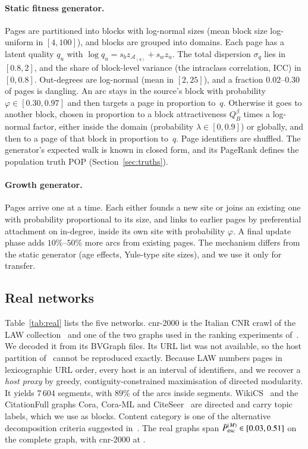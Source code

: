 \documentclass[11pt,a4paper]{article}
\theoremstyle{definition}
\theoremstyle{remark}
\newcommand{\Pbar}{\bar P^{(M)}_{\mathrm{esc}}}
\begin{document}
\paragraph{Static fitness generator.} Pages are partitioned into blocks with log-normal sizes (mean
block size log-uniform in $[4,100]$), and blocks are grouped into domains. Each page has a latent quality
$q_u$ with $\log q_u=s_bz_{\mathcal A_{(u)}}+s_wz_u$. The total dispersion $\sigma_q$ lies in $[0.8,2]$,
and the share of block-level variance (the intraclass correlation, ICC) in $[0,0.8]$. Out-degrees are
log-normal (mean in $[2,25]$), and a fraction $0.02$--$0.30$ of pages is dangling. An arc stays in the
source's block with probability $\varphi\in[0.30,0.97]$ and then targets a page in proportion to~$q$.
Otherwise it goes to another block, chosen in proportion to a block attractiveness $Q_B^\beta$ times a
log-normal factor, either inside the domain (probability $\lambda\in[0,0.9]$) or globally, and then to a
page of that block in proportion to~$q$. Page identifiers are shuffled. The generator's expected walk
is known in closed form, and its PageRank defines the population truth POP (Section~\ref{sec:truths}).
\paragraph{Growth generator.} Pages arrive one at a time. Each either founds a new site or joins an
existing one with probability proportional to its size, and links to earlier pages by preferential
attachment on in-degree, inside its own site with probability $\varphi$. A final update phase adds
$10\%$--$50\%$ more arcs from existing pages. The mechanism differs from the static generator (age
effects, Yule-type site sizes), and we use it only for transfer.

\subsection{Real networks}
Table~\ref{tab:real} lists the five networks. cnr-2000 is the Italian CNR crawl of the LAW
collection~\cite{boldi04,boldi04ubi} and one of the two graphs used in the ranking experiments
of~\cite{ng13}. We decoded it from its BVGraph files. Its URL list was not available, so the host
partition of~\cite{ng13} cannot be reproduced exactly. Because LAW numbers pages in lexicographic URL
order, every host is an interval of identifiers, and we recover a \emph{host proxy} by greedy,
contiguity-constrained maximisation of directed modularity. It yields 7\,604 segments, with $89\%$ of
the arcs inside segments. WikiCS~\cite{mernyei20} and the CitationFull graphs Cora, Cora-ML and
CiteSeer~\cite{bojchevski18} are directed and carry topic labels, which we use as blocks. Content
category is one of the alternative decomposition criteria suggested in~\cite[§5]{ng13}. The real graphs
span $\Pbar\in[\PbarRealMin,\PbarRealMax]$ on the complete graph, with cnr-2000 at \PbarCnr.
\end{document}

